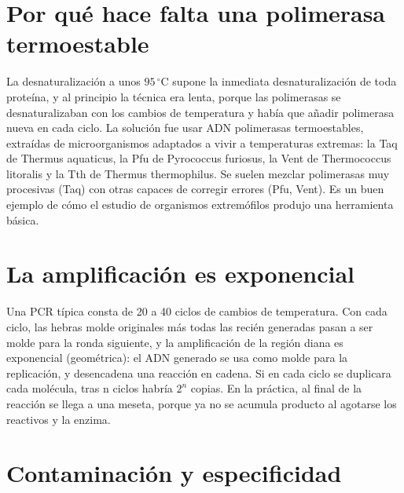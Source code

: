 \documentclass{book}
\begin{document}

\section{Por qué hace falta una polimerasa termoestable}

La desnaturalización a unos \(95\,{}^{\circ}\mathrm{C}\) supone la inmediata desnaturalización de toda proteína, y al principio la técnica era lenta, porque las polimerasas se desnaturalizaban con los cambios de temperatura y había que añadir polimerasa nueva en cada ciclo. La solución fue usar ADN polimerasas termoestables, extraídas de microorganismos adaptados a vivir a temperaturas extremas: la Taq de Thermus aquaticus, la Pfu de Pyrococcus furiosus, la Vent de Thermococcus litoralis y la Tth de Thermus thermophilus. Se suelen mezclar polimerasas muy procesivas (Taq) con otras capaces de corregir errores (Pfu, Vent). Es un buen ejemplo de cómo el estudio de organismos extremófilos produjo una herramienta básica.


\section{La amplificación es exponencial}

Una PCR típica consta de 20 a 40 ciclos de cambios de temperatura. Con cada ciclo, las hebras molde originales más todas las recién generadas pasan a ser molde para la ronda siguiente, y la amplificación de la región diana es exponencial (geométrica): el ADN generado se usa como molde para la replicación, y desencadena una reacción en cadena. Si en cada ciclo se duplicara cada molécula, tras n ciclos habría \(2^{n}\) copias. En la práctica, al final de la reacción se llega a una meseta, porque ya no se acumula producto al agotarse los reactivos y la enzima.


\section{Contaminación y especificidad}
\end{document}
